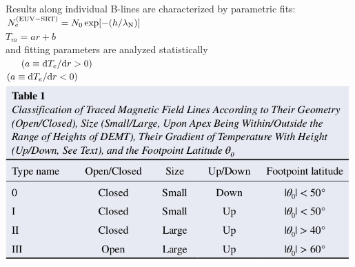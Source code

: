 \documentclass{beamer}
\begin{document}
{{%
\salto
\begin{columns}
Results along individual B-lines are characterized by parametric fits:\\
$ N_e^{\rm (EUV-SRT)} = N_0\, {\rm exp}{[-(h/\lambda_{{\rm N}})]}$\\
$ T_m = ar + b$\\
and fitting parameters are analyzed statistically\\
 \, \, \,  $(a \equiv \dTm_dr>0)$\\
 $(a \equiv \dTm_dr<0)$
\includegraphics[width=0.99\textwidth]{figuras/table1_lloveras_2022.png}
\end{columns}
}
}
\end{document}
